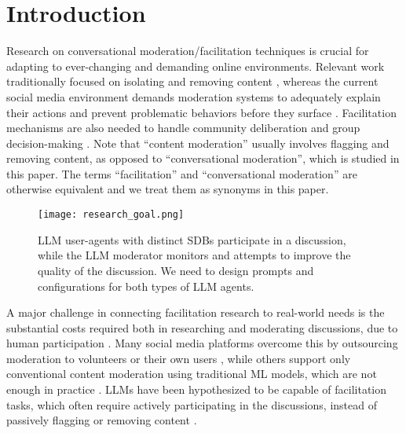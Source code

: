 %
\section{Introduction}
\label{sec:introduction}

Research on conversational moderation/facilitation techniques is crucial for adapting to ever-changing and demanding online environments. Relevant work traditionally focused on isolating and removing content \cite{seering_self_moderation, cresci_pesonalized_interventions}, whereas the current social media environment demands moderation systems to adequately explain their actions and prevent problematic behaviors before they surface \cite{cho-etal-2024-language, seering_self_moderation, cresci_pesonalized_interventions, make_reddit_great}.  Facilitation mechanisms are also needed to handle community deliberation and group decision-making \cite{kim_et_al_chatbot, seering_self_moderation}. Note that “content moderation” usually involves flagging and removing content, as opposed to “conversational moderation”, which is studied in this paper. The terms “facilitation” and “conversational moderation” are otherwise equivalent \cite{argyle2023, korre2025evaluation, falk-etal-2021-predicting} and we treat them as synonyms in this paper.

\begin{figure}[t]
	\centering
	\texttt{[image: research\_goal.png]}
	\caption{\ac{LLM} user-agents with distinct \acp{SDB} participate in a discussion, while the \ac{LLM} moderator monitors and attempts to improve the quality of the discussion. We need to design prompts and configurations for both types of \ac{LLM} agents.}
	\label{fig::goals}
\end{figure}

A major challenge in connecting facilitation research to real-world needs is the substantial costs required both in researching and moderating discussions, due to human participation \cite{rossi_2024}. Many social media platforms overcome this by outsourcing moderation to volunteers or their own users \cite{Matias2019TheCL, schaffner_community_guidelines}, while others support only conventional content moderation using traditional \ac{ML} models, which are not enough in practice \cite{horta_automated_moderation, schaffner_community_guidelines}. \acfp{LLM} have been hypothesized to be capable of facilitation tasks, which often require actively participating in the discussions, instead of passively flagging or removing content \cite{small-polis-llm, korre2025evaluation}. 

